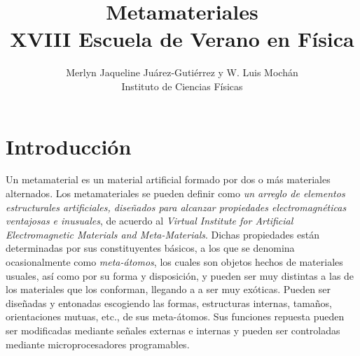 \documentclass[12pt]{article}
\title{Metamateriales \\
  XVIII Escuela de Verano en Física}
\author{ Merlyn Jaqueline Juárez-Gutiérrez y W. Luis Mochán\\
  Instituto de Ciencias Físicas}
\begin{document}
\maketitle

\section{Introducción}

Un metamaterial es un material artificial formado por
dos o más materiales alternados. Los metamateriales se pueden definir como
{\em un arreglo de elementos estructurales artificiales, diseñados
  para alcanzar propiedades electromagnéticas ventajosas e
  inusuales}\cite{Metamorphose}, de acuerdo al
{\em Virtual Institute for Artificial Electromagnetic Materials and
  Meta-Materials}.
Dichas propiedades están
determinadas por sus constituyentes básicos, a los que se denomina
ocasionalmente como {\em meta-átomos}, los cuales son objetos hechos de
materiales usuales, así como por su forma y disposición, y pueden ser
muy distintas a las de los materiales que los conforman, llegando a
a ser muy exóticas. Pueden ser diseñadas y entonadas escogiendo las formas,
estructuras internas, tamaños, orientaciones mutuas, etc., de sus
meta-átomos.  Sus funciones repuesta pueden ser
modificadas mediante señales externas e internas y pueden ser
controladas mediante microprocesadores
programables.\cite{IntroductiontoMetamaterialsandNanophotonics}
\end{document}
